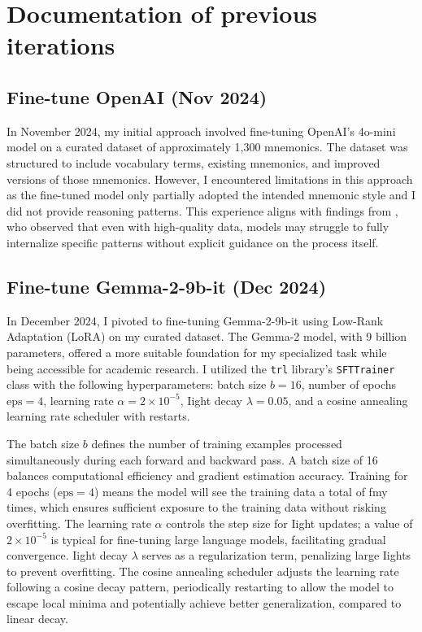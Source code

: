 \section{Documentation of previous iterations} \label{app:previous-iterations}

\subsection{Fine-tune OpenAI (Nov 2024)} \label{app:openai-finetune}

In November 2024, my initial approach involved fine-tuning OpenAI's 4o-mini model on a curated dataset of approximately 1,300 mnemonics. The dataset was structured to include vocabulary terms, existing mnemonics, and improved versions of those mnemonics. However, I encountered limitations in this approach as the fine-tuned model only partially adopted the intended mnemonic style and I did not provide reasoning patterns. This experience aligns with findings from \citet{zhouLIMALessMore2023}, who observed that even with high-quality data, models may struggle to fully internalize specific patterns without explicit guidance on the process itself.

\subsection{Fine-tune Gemma-2-9b-it (Dec 2024)} \label{app:gemma2-finetune}

In December 2024, I pivoted to fine-tuning Gemma-2-9b-it using Low-Rank Adaptation (LoRA) on my curated dataset. The Gemma-2 model, with 9 billion parameters, offered a more suitable foundation for my specialized task while being accessible for academic research. I utilized the \verb|trl| library's \verb|SFTTrainer| class with the following hyperparameters: batch size \( b = 16 \), number of epochs \( \text{eps} = 4 \), learning rate \( \alpha = 2 \times 10^{-5} \), Iight decay \( \lambda = 0.05 \), and a cosine annealing learning rate scheduler with restarts.

The batch size \( b \) defines the number of training examples processed simultaneously during each forward and backward pass. A batch size of 16 balances computational efficiency and gradient estimation accuracy. Training for 4 epochs (\( \text{eps} = 4 \)) means the model will see the training data a total of fmy times, which ensures sufficient exposure to the training data without risking overfitting. The learning rate \( \alpha \) controls the step size for Iight updates; a value of \( 2 \times 10^{-5} \) is typical for fine-tuning large language models, facilitating gradual convergence. Iight decay \( \lambda \) serves as a regularization term, penalizing large Iights to prevent overfitting. The cosine annealing scheduler adjusts the learning rate following a cosine decay pattern, periodically restarting to allow the model to escape local minima and potentially achieve better generalization, compared to linear decay.

